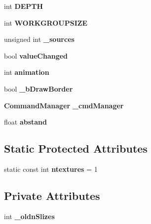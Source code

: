 \begin{DoxyCompactItemize}
\item 
int {\bfseries D\-E\-P\-T\-H}\label{classSoundfieldViewer_1_1FieldViewerBase_a61a4dee24d73ffa4fdbd418c19801ae0}

\item 
int {\bfseries W\-O\-R\-K\-G\-R\-O\-U\-P\-S\-I\-Z\-E}\label{classSoundfieldViewer_1_1FieldViewerBase_a3ad0145b772a9f16b0b59d381e74bb2f}

\item 
unsigned int {\bfseries \-\_\-sources}\label{classSoundfieldViewer_1_1FieldViewerBase_a7bb74fec52d1335b83560d6cea7e3255}

\item 
bool {\bfseries value\-Changed}\label{classSoundfieldViewer_1_1FieldViewerBase_a8fd31267dac5a158cd5a5792f8be016a}

\item 
int {\bfseries animation}\label{classSoundfieldViewer_1_1FieldViewerBase_af6fc70bc64c7ffd91716585c88578b8a}

\item 
bool {\bfseries \-\_\-b\-Draw\-Border}\label{classSoundfieldViewer_1_1FieldViewerBase_a13e86cf40fae265f37028cb4c29cbcc4}

\item 
{\bf Command\-Manager} {\bfseries \-\_\-cmd\-Manager}\label{classSoundfieldViewer_1_1FieldViewerBase_a003f4f19f20bd9164f4156f7899df21c}

\item 
float {\bfseries abstand}\label{classSoundfieldViewer_1_1FieldViewerBase_a743a0b1cfd1a1929244479412a60ec63}

\end{DoxyCompactItemize}
\subsection*{Static Protected Attributes}
\begin{DoxyCompactItemize}
\item 
static const int {\bfseries ntextures} = 1\label{classSoundfieldViewer_1_1FieldViewerBase_a967e7d3ac493cdd597a0d21f1bdf4ff4}

\end{DoxyCompactItemize}
\subsection*{Private Attributes}
\begin{DoxyCompactItemize}
\item 
int {\bfseries \-\_\-oldn\-Slizes}\label{classSoundfieldViewer_1_1FieldViewerBase_a0efed09531738337b10f9fe3fcfc7e0f}

\end{DoxyCompactItemize}

